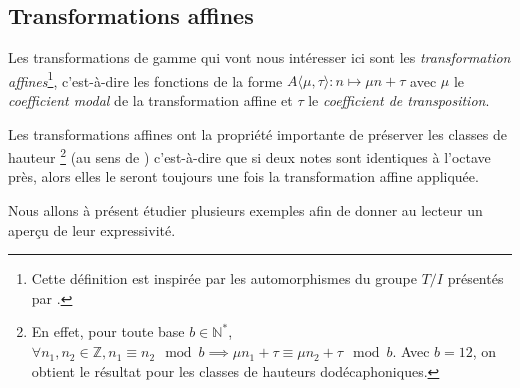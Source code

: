 \subsection{Transformations affines}

Les transformations de gamme qui vont nous intéresser ici sont les \emph{transformation affines}\footnote{Cette définition est inspirée par les automorphismes du groupe $T/I$ présentés par \textcite{lewin1990klumpenhouwer}.}, c'est-à-dire les fonctions de la forme $A\langle\mu,\tau\rangle : n \mapsto \mu n + \tau$ avec $\mu$ le \emph{coefficient modal} de la transformation affine et $\tau$ le \emph{coefficient de transposition}. 

Les transformations affines ont la propriété importante de préserver les classes de hauteur \footnote{En effet, pour toute base $b\in \mathbb{N}^*$, $\forall n_1,n_2 \in \mathbb{Z}, n_1 \equiv n_2 \mod b \implies \mu n_1 + \tau \equiv \mu n_2 + \tau \mod b$. Avec $b=12$, on obtient le résultat pour les classes de hauteurs dodécaphoniques. }  (au sens de \cite{forte1973structure}) c'est-à-dire que si deux notes sont identiques à l'octave près, alors elles le seront toujours une fois la transformation affine appliquée. 

Nous allons à présent étudier plusieurs exemples afin de donner au lecteur un aperçu de leur expressivité.